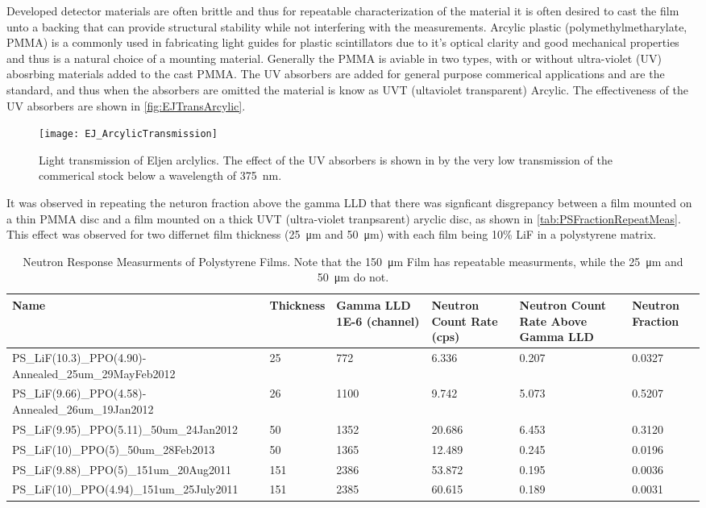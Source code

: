 \documentclass[draftcls,onecolumn]{IEEEtran}
\begin{document}
Developed detector materials are often brittle and thus for repeatable characterization of the material it is often desired to cast the film unto a backing that can provide structural stability while not interfering with the measurements.
Arcylic plastic (polymethylmetharylate, PMMA) is a commonly used in fabricating light guides for plastic scintillators due to it's optical clarity and good mechanical properties and thus is a natural choice of a mounting material.
Generally the PMMA is aviable in two types, with or without ultra-violet (UV) abosrbing materials added to the cast PMMA.
The UV absorbers are added for general purpose commerical applications and are the standard, and thus when the absorbers are omitted the material is know as UVT (ultaviolet transparent) Arcylic.
The effectiveness of the UV absorbers are shown in \autoref{fig:EJTransArcylic}.
\begin{figure}
  \centering
  \texttt{[image: EJ\_ArcylicTransmission]}
	\caption[Light Transmission of Eljen Arcylics (Eljen)]{Light transmission of Eljen arclylics.  The effect of the UV absorbers is shown in by the very low transmission of the commerical stock below a wavelength of \SI{375}{\nm}.}
	\label{fig:EJTransArcylic}
\end{figure}	
It was observed in repeating the neturon fraction above the gamma LLD that there was signficant disgrepancy between a film mounted on a thin PMMA disc and a film mounted on a thick UVT (ultra-violet tranpsarent) aryclic disc, as shown in \autoref{tab:PSFractionRepeatMeas}.
This effect was observed for two differnet film thickness (\SI{25}{\um} and \SI{50}{\um}) with each film being 10\% LiF in a polystyrene matrix.
\begin{table}
	\centering
	\caption[PS Film Neutron Fraction Measurments]{Neutron Response Measurments of Polystyrene Films.  Note that the \SI{150}{\um} Film has repeatable measurments, while the \SI{25}{\um} and \SI{50}{\um} do not.}
	\label{tab:PSFractionRepeatMeas}
\begin{tabular}{p{4cm} | m{1cm} m{1.5cm} m{1.5cm} m{2cm} m{2cm}}
\toprule
Name&Thickness&Gamma LLD \num{1E-6} (channel) & Neutron Count Rate (cps) & Neutron Count Rate Above Gamma LLD & Neutron Fraction\\
\midrule
PS\_LiF(10.3)\_PPO(4.90)-Annealed\_25um\_29MayFeb2012 & 25 & 772&6.336&0.207&0.0327 \\
PS\_LiF(9.66)\_PPO(4.58)-Annealed\_26um\_19Jan2012    & 26&1100&9.742&5.073&0.5207 \\
\hline
PS\_LiF(9.95)\_PPO(5.11)\_50um\_24Jan2012             &50&1352&20.686&6.453&0.3120 \\
PS\_LiF(10)\_PPO(5)\_50um\_28Feb2013		  &50&1365&12.489&0.245&0.0196 \\
\hline
PS\_LiF(9.88)\_PPO(5)\_151um\_20Aug2011	          &151&2386&53.872&0.195&0.0036 \\
PS\_LiF(10)\_PPO(4.94)\_151um\_25July2011	          &151&2385&60.615&0.189&0.0031 \\
\end{tabular}
\end{table}
\end{document}

